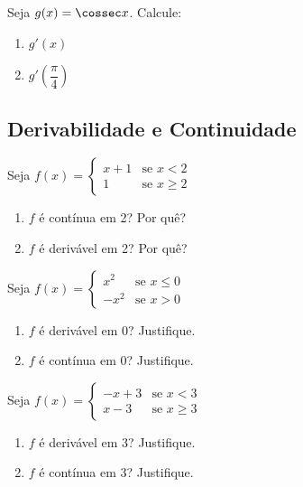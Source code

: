 \begin{exercicio}[7]
\label{ex:7.5.7}
Seja $g(x) = \cossec x$. Calcule:
\begin{enumerate}[label=\alph*)]
    \item $g'(x)$
    \item $g'\!\left(\dfrac{\pi}{4}\right)$
\end{enumerate}
\end{exercicio}

\clearpage

\subsection{Derivabilidade e Continuidade}

\begin{exercicio}[1]
\label{ex:7.6.1}
Seja $f(x) = \begin{cases} x + 1 & \text{se } x < 2 \\ 1 & \text{se } x \ge 2 \end{cases}$
\begin{enumerate}[label=\alph*)]
    \item $f$ é contínua em 2? Por quê?
    \item $f$ é derivável em 2? Por quê?
\end{enumerate}
\end{exercicio}

\begin{exercicio}[2]
\label{ex:7.6.2}
Seja $f(x) = \begin{cases} x^2 & \text{se } x \le 0 \\ -x^2 & \text{se } x > 0 \end{cases}$
\begin{enumerate}[label=\alph*)]
    \item $f$ é derivável em 0? Justifique.
    \item $f$ é contínua em 0? Justifique.
\end{enumerate}
\end{exercicio}

\begin{exercicio}[3]
\label{ex:7.6.3}
Seja $f(x) = \begin{cases} -x + 3 & \text{se } x < 3 \\ x - 3 & \text{se } x \ge 3 \end{cases}$
\begin{enumerate}[label=\alph*)]
    \item $f$ é derivável em 3? Justifique.
    \item $f$ é contínua em 3? Justifique.
\end{enumerate}
\end{exercicio}

